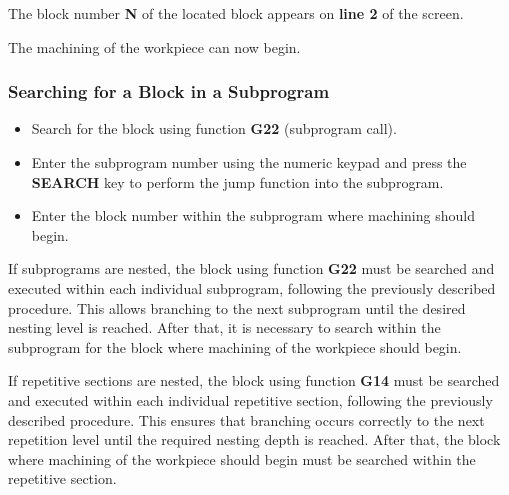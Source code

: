 The block number \textbf{N} of the located block appears on \textbf{line 2} of the screen.

The machining of the workpiece can now begin.

\subsubsection*{Searching for a Block in a Subprogram}

\begin{itemize}
    \item Search for the block using function \textbf{G22} (subprogram call).
\end{itemize}

\begin{itemize}
    \item Enter the subprogram number using the numeric keypad and press the \textbf{SEARCH} key to perform the jump function into the subprogram.
\end{itemize}

\begin{itemize}
    \item Enter the block number within the subprogram where machining should begin.
\end{itemize}

\begin{itemize}
\end{itemize}

\vspace{.5cm}

\notes

If subprograms are nested, the block using function \textbf{G22} must be searched and executed within each individual subprogram, following the previously described procedure.  
This allows branching to the next subprogram until the desired nesting level is reached.  
After that, it is necessary to search within the subprogram for the block where machining of the workpiece should begin.

If repetitive sections are nested, the block using function \textbf{G14} must be searched and executed within each individual repetitive section, following the previously described procedure.  
This ensures that branching occurs correctly to the next repetition level until the required nesting depth is reached.  
After that, the block where machining of the workpiece should begin must be searched within the repetitive section.

